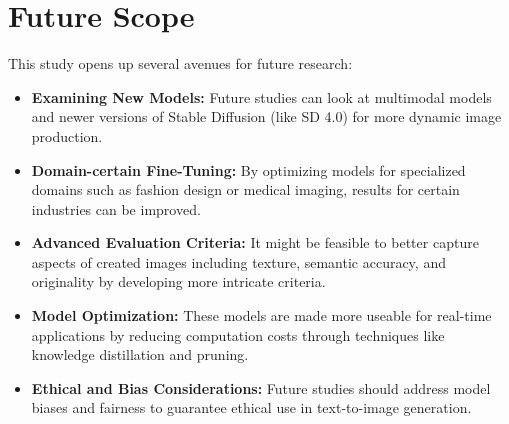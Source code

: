 \documentclass{article}
\begin{document}
\section{Future Scope}
This study opens up several avenues for future research:
\begin{itemize}
    \item \textbf{Examining New Models:} Future studies can look at multimodal models and newer versions of Stable Diffusion (like SD 4.0) for more dynamic image production.
    \item \textbf{Domain-certain Fine-Tuning:} By optimizing models for specialized domains such as fashion design or medical imaging, results for certain industries can be improved.
    \item \textbf{Advanced Evaluation Criteria:} It might be feasible to better capture aspects of created images including texture, semantic accuracy, and originality by developing more intricate criteria.
    \item \textbf{Model Optimization:} These models are made more useable for real-time applications by reducing computation costs through techniques like knowledge distillation and pruning.
    \item \textbf{Ethical and Bias Considerations:} Future studies should address model biases and fairness to guarantee ethical use in text-to-image generation.
\end{itemize}
\end{document}
